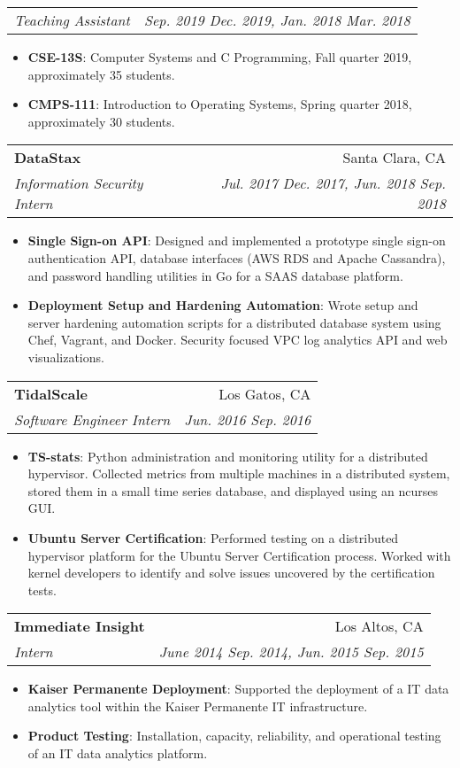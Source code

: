 \documentclass[letterpaper,10pt,oneside]{memoir}
\makeatletter
\newcommand{\resumeItem}[2]{
  \item\small{
    \textbf{#1}{: #2}
  }
}
\newcommand{\resumeSubheading}[4]{
  \vspace{1pt}%
    \begin{tabular*}{0.99\textwidth}[t]{l@{\extracolsep{\fill}}r}
      \textbf{#1} & #2 \\
      \textit{\small #3} & \textit{\small #4} \\
    \end{tabular*}
}
\newcommand{\resumeSubheadingContinue}[2]{
  \vspace{-1pt}
    \begin{tabular*}{0.99\textwidth}[t]{l@{\extracolsep{\fill}}r}
      \textit{\small #1} & \textit{\small #2} \\
    \end{tabular*}
}
\newcommand{\resumeItemListStart}{\begin{itemize}[noitemsep,nolistsep]}
\newcommand{\resumeItemListEnd}{\end{itemize}}
\makeatother
\begin{document}
    \resumeSubheadingContinue
      {Teaching Assistant}{Sep. 2019 \textemdash{} Dec. 2019, Jan. 2018 \textemdash{} Mar. 2018}
      \resumeItemListStart
        \resumeItem{CSE-13S}
          {Computer Systems and C Programming, Fall quarter 2019, approximately 35 students.}
        \resumeItem{CMPS-111}
          {Introduction to Operating Systems, Spring quarter 2018, approximately 30 students.}
      \resumeItemListEnd

    \resumeSubheading
      {DataStax}{Santa Clara, CA}
      {Information Security Intern }{ Jul. 2017 \textemdash{} Dec. 2017, Jun. 2018 \textemdash{} Sep. 2018}
      \resumeItemListStart
        \resumeItem{Single Sign-on API}
	  {Designed and implemented a prototype single sign-on authentication API, database interfaces (AWS RDS and Apache Cassandra), and password handling utilities in Go for a SAAS database platform.}
        \resumeItem{Deployment Setup and Hardening Automation}
          {Wrote setup and server hardening automation scripts for a distributed database system using Chef, Vagrant, and Docker. Security focused VPC log analytics API and web visualizations.}
      \resumeItemListEnd

    \resumeSubheading
      {TidalScale}{Los Gatos, CA}
      {Software Engineer Intern}{Jun. 2016 \textemdash{} Sep. 2016}
      \resumeItemListStart
        \resumeItem{TS-stats}
          {Python administration and monitoring utility for a distributed hypervisor. Collected metrics from multiple machines in a distributed system, stored them in a small time series database, and displayed using an ncurses GUI.}
        \resumeItem{Ubuntu Server Certification}
	  {Performed testing on a distributed hypervisor platform for the Ubuntu Server Certification process. Worked with kernel developers to identify and solve issues uncovered by the certification tests.}
      \resumeItemListEnd

    \resumeSubheading
      {Immediate Insight}{Los Altos, CA}
      {Intern}{June 2014 \textemdash{} Sep. 2014, Jun. 2015 \textemdash{} Sep. 2015}
      \resumeItemListStart
        \resumeItem{Kaiser Permanente Deployment}
	  {Supported the deployment of a IT data analytics tool within the Kaiser Permanente IT infrastructure.}
        \resumeItem{Product Testing}
          {Installation, capacity, reliability, and operational testing of an IT data analytics platform.}
      \resumeItemListEnd

\end{document}
